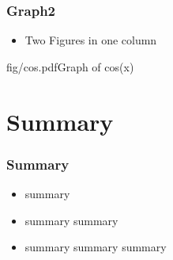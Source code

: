 \documentclass[12pt]{beamer}
\begin{document}
\begin{frame}
  \frametitle{Graph2}

  \begin{itemize}
    \item Two Figures in one column
  \end{itemize}

            {fig/cos.pdf}{Graph of cos(x)}

\end{frame}

\section{Summary}

\begin{frame}
  \frametitle{Summary}

  \begin{itemize}
    \item summary 
    \item summary summary
    \item summary summary summary
  \end{itemize}

\end{frame}
\end{document}
